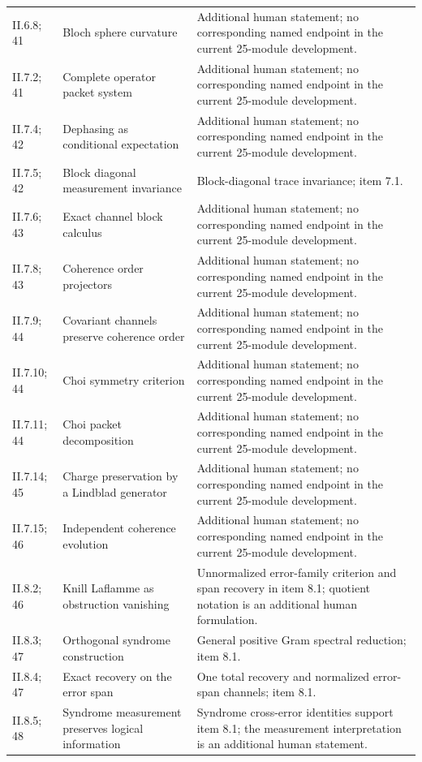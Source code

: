 \begin{longtable}{@{}p{.13\linewidth}p{.34\linewidth}p{.46\linewidth}@{}}
II.6.8; 41 & Bloch sphere curvature & Additional human statement; no corresponding named endpoint in the current 25-module development.\\
II.7.2; 41 & Complete operator packet system & Additional human statement; no corresponding named endpoint in the current 25-module development.\\
II.7.4; 42 & Dephasing as conditional expectation & Additional human statement; no corresponding named endpoint in the current 25-module development.\\
II.7.5; 42 & Block diagonal measurement invariance & Block-diagonal trace invariance; item 7.1.\\
II.7.6; 43 & Exact channel block calculus & Additional human statement; no corresponding named endpoint in the current 25-module development.\\
II.7.8; 43 & Coherence order projectors & Additional human statement; no corresponding named endpoint in the current 25-module development.\\
II.7.9; 44 & Covariant channels preserve coherence order & Additional human statement; no corresponding named endpoint in the current 25-module development.\\
II.7.10; 44 & Choi symmetry criterion & Additional human statement; no corresponding named endpoint in the current 25-module development.\\
II.7.11; 44 & Choi packet decomposition & Additional human statement; no corresponding named endpoint in the current 25-module development.\\
II.7.14; 45 & Charge preservation by a Lindblad generator & Additional human statement; no corresponding named endpoint in the current 25-module development.\\
II.7.15; 46 & Independent coherence evolution & Additional human statement; no corresponding named endpoint in the current 25-module development.\\
II.8.2; 46 & Knill Laflamme as obstruction vanishing & Unnormalized error-family criterion and span recovery in item 8.1; quotient notation is an additional human formulation.\\
II.8.3; 47 & Orthogonal syndrome construction & General positive Gram spectral reduction; item 8.1.\\
II.8.4; 47 & Exact recovery on the error span & One total recovery and normalized error-span channels; item 8.1.\\
II.8.5; 48 & Syndrome measurement preserves logical information & Syndrome cross-error identities support item 8.1; the measurement interpretation is an additional human statement.\\

\end{longtable}
